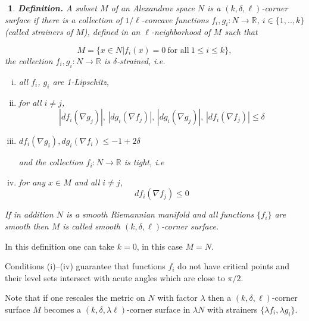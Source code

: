 \documentclass{article}
\def\noi{\noindent}
\def\RR{\mathbb{R}}
\def\ge{\geqslant}
\def\le{\leqslant}
\newtheorem{Nothing}[thm]{$\!\!\!$}
\begin{document}
\begin{Nothing}{\bf Definition.} A subset  $M$ of an Alexandrov space $N$
is a \emph{$(k,\delta,\ell)$-corner surface} if there is a collection of
$1/\ell$-concave functions $f_i, g_i:N\to \RR$, $i\in \{1,..,k\}$
(called \emph{strainers} of $M$), defined in an $\ell$-neighborhood of $M$ such that

$$M=\{x\in N|f_i(x)=0\ \text{for all} \  1\le i\le k\},$$
the collection $f_i, g_i:N\to \RR$ is $\delta$-strained, i.e.
\begin{enumerate}[(i)]
\item all $f_i$, $g_i$ are 1-Lipschitz,
\item for all $i\not=j$,
$$|df_i(\nabla g_j)|,\,|dg_i(\nabla f_j)|,\,|dg_i(\nabla g_j)|,\, |df_i(\nabla f_j)|\le\delta$$
\item $df_i(\nabla g_i), dg_i(\nabla f_i)\le -1+2\delta$

\noi \!\!\!\!\!\!\!\!\!\!\!\!\!\!and the collection $f_i:N\to \RR$ is tight, i.e

\item for any $x\in M$ and all $i\not=j$,
$$df_i(\nabla f_j)\le 0 $$
\end{enumerate}
If in addition $N$ is a smooth Riemannian manifold and all functions
$\{f_i\}$ are smooth then $M$ is called {\it smooth $(k,\delta,\ell)$-corner surface}.
\end{Nothing}

\noi{\bf Remarks.} In this definition one can take $k=0$, in this case $M=N$.

Conditions (i)--(iv) guarantee that functions $f_i$ do not have critical points and
their level sets intersect with acute angles which are close  to $\pi/2$.

Note that if one rescales the metric on $N$ with factor $\lambda$ then a
$(k,\delta,\ell)$-corner surface $M$ becomes a $(k,\delta,\lambda\ell)$-corner
surface in $\lambda N$ with strainers $\{\lambda f_i,\lambda g_i\}$.
\end{document}
